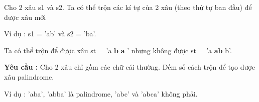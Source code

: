 Cho 2 xâu s1 và s2. Ta có thể trộn các kí tự của 2 xâu (theo thứ tự ban đầu) để được xâu mới

Ví dụ : s1 = 'ab' và s2 = 'ba'.

Ta có thể trộn để được xâu st = 'a\textbf{ b }\textbf{ a } ' nhưng không được st = 'a\textbf{ ab }b'.

\textbf{Yêu cầu : } Cho 2 xâu chỉ gồm các chữ cái thường. Đếm số cách trộn để tạo được xâu palindrome.

Ví dụ : 'aba', 'abba' là palindrome, 'abc' và 'abca' không phải.
